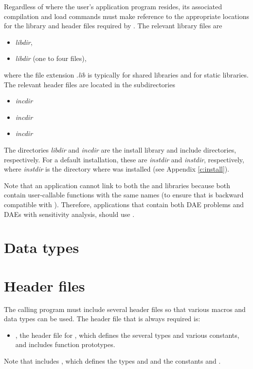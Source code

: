 Regardless of where the user's application program resides, its
associated compilation and load commands must make reference to the
appropriate locations for the library and header files required by
{\idas}.  The relevant library files are
\begin{itemize}
\item {\em libdir},
\item {\em libdir} (one to four files),
\end{itemize}
where the file extension .{\em lib} is typically  for shared libraries
and  for static libraries. The relevant header files are located in
the subdirectories
\begin{itemize}
\item {\em incdir}
\item {\em incdir}
\item {\em incdir}
\end{itemize}
The directories {\em libdir} and {\em incdir} are the install library
and include directories, respectively. For a default installation,
these are {\em instdir} and {\em instdir},
respectively, where {\em instdir} is the directory where {\sundials}
was installed (see Appendix \ref{c:install}).

Note that an application cannot link to both the {\ida} and {\idas} libraries
because both contain user-callable functions with the same names (to ensure that {\idas}
is backward compatible with {\ida}). Therefore, applications that contain both
DAE problems and DAEs with sensitivity analysis, should use {\idas}.

\section{Data types}\label{s:types}


\section{Header files}\label{ss:header_sim}
The calling program must include several header files so that various macros
and data types can be used. The header file that is always required is:
\begin{itemize}
\item  {}, 
  the header file for {\idas}, which defines the several
  types and various constants, and includes function prototypes.
\end{itemize}
Note that  includes , 
which defines the types  and 
and the constants  and .

